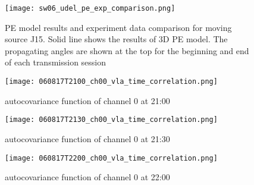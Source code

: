 \begin{figure}[H]
  \centering
  \texttt{[image: sw06\_udel\_pe\_exp\_comparison.png]}
  \caption{PE model results and experiment data comparison for moving source J15. Solid line shows the results of 3D PE model. The propagating angles are shown at the top for the beginning and end of each transmission session}\label{fig:a2130}
\end{figure}

\begin{figure}[H]
	\centering
	\texttt{[image: 060817T2100\_ch00\_vla\_time\_correlation.png]}
	\caption{autocovariance function of channel 0 at 21:00}
\end{figure}

\begin{figure}[H]
	\centering
	\texttt{[image: 060817T2130\_ch00\_vla\_time\_correlation.png]}
	\caption{autocovariance function of channel 0 at 21:30}
\end{figure}

\begin{figure}[H]
	\centering
	\texttt{[image: 060817T2200\_ch00\_vla\_time\_correlation.png]}
	\caption{autocovariance function of channel 0 at 22:00}
\end{figure}